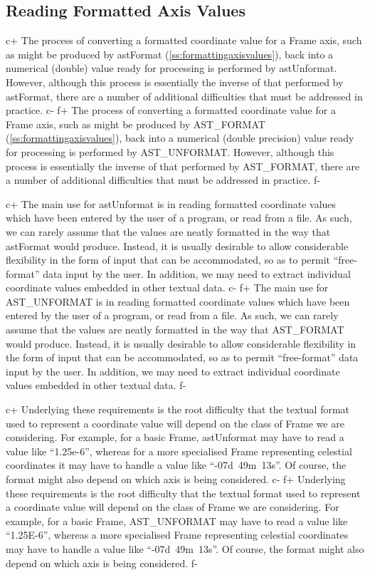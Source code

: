 \documentclass[twoside,11pt]{article}
\newcommand{\secref}[1]{\S\ref{#1}}
\renewcommand{\secref}[1]{\ref{#1}}
\begin{document}
\subsection{\label{ss:unformattingaxisvalues}Reading Formatted Axis Values}

c+
The process of converting a formatted coordinate value for a Frame
axis, such as might be produced by astFormat
(\secref{ss:formattingaxisvalues}), back into a numerical (double)
value ready for processing is performed by astUnformat.  However,
although this process is essentially the inverse of that performed by
astFormat, there are a number of additional difficulties that must be
addressed in practice.
c-
f+
The process of converting a formatted coordinate value for a Frame
axis, such as might be produced by AST\_FORMAT
(\secref{ss:formattingaxisvalues}), back into a numerical (double
precision) value ready for processing is performed by AST\_UNFORMAT.
However, although this process is essentially the inverse of that
performed by AST\_FORMAT, there are a number of additional difficulties
that must be addressed in practice.
f-

c+
The main use for astUnformat is in reading formatted coordinate values
which have been entered by the user of a program, or read from a
file. As such, we can rarely assume that the values are neatly
formatted in the way that astFormat would produce. Instead, it is
usually desirable to allow considerable flexibility in the form of
input that can be accommodated, so as to permit ``free-format'' data
input by the user. In addition, we may need to extract individual
coordinate values embedded in other textual data.
c-
f+
The main use for AST\_UNFORMAT is in reading formatted coordinate
values which have been entered by the user of a program, or read from
a file. As such, we can rarely assume that the values are neatly
formatted in the way that AST\_FORMAT would produce. Instead, it is
usually desirable to allow considerable flexibility in the form of
input that can be accommodated, so as to permit ``free-format'' data
input by the user. In addition, we may need to extract individual
coordinate values embedded in other textual data.
f-

c+
Underlying these requirements is the root difficulty that the textual
format used to represent a coordinate value will depend on the class
of Frame we are considering. For example, for a basic Frame,
astUnformat may have to read a value like ``1.25e-6'', whereas for a
more specialised Frame representing celestial coordinates it may have
to handle a value like ``-07d~49m~13s''. Of course, the format might
also depend on which axis is being considered.
c-
f+
Underlying these requirements is the root difficulty that the textual
format used to represent a coordinate value will depend on the class
of Frame we are considering. For example, for a basic Frame,
AST\_UNFORMAT may have to read a value like ``1.25E-6'', whereas a
more specialised Frame representing celestial coordinates may have to
handle a value like ``-07d~49m~13s''. Of course, the format might also
depend on which axis is being considered.
f-
\end{document}
